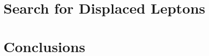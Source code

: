 \documentclass{ucetd}
\begin{document}
\part{Search for Displaced Leptons}








\cleardoublepage 

\part{Conclusions}

\cleardoublepage 


\printbibliography[heading=bibintoc,title={References}]

%
%
\end{document}
